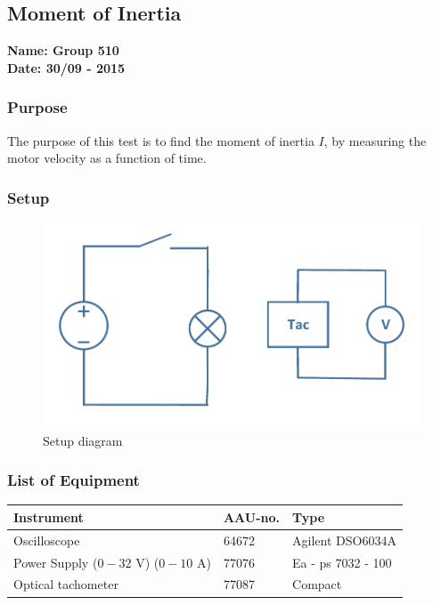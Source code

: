 \pagebreak
\subsection{Moment of Inertia} %
\textbf{Name: Group 510}\\
\textbf{Date: 30/09 - 2015}

\subsubsection{Purpose}
The purpose of this test is to find the moment of inertia $I$, by measuring the motor velocity as a function of time.

\subsubsection{Setup}
\begin{figure}[H]
  \centering
	\includegraphics[scale=0.5]{figures/MotorTest7.pdf}
	\caption{Setup diagram}
\end{figure}

\subsubsection{List of Equipment}

\begin{table}[H]
\begin{tabular}{|l|l|p{4cm}|}
\hline%
  \textbf{Instrument}                        &  \textbf{AAU-no.}  &  \textbf{Type}       \\
\hline%
  Oscilloscope                               &  64672             &  Agilent DSO6034A    \\
\hline%
  Power Supply ($0 - 32$ V) ($0 - 10$ A)     &  77076             &  Ea - ps 7032 - 100  \\
\hline%
  Optical tachometer                         &  77087             &  Compact             \\
\hline%
\end{tabular}
\end{table}

